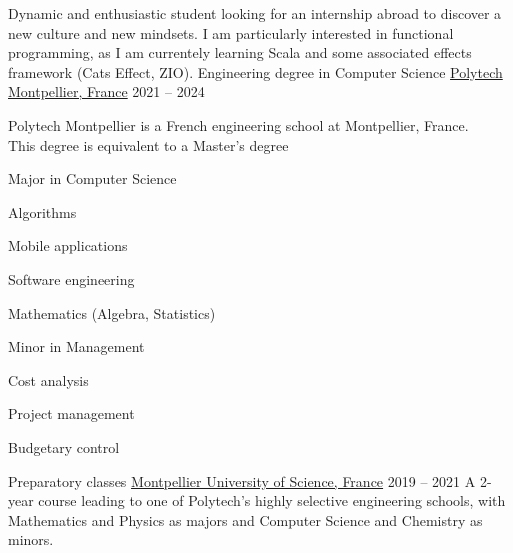 \documentclass[11pt]{spidercv}
\begin{document}
\begin{MainPart}

  \color{Black}
  \vspace{0.25cm}
  Dynamic and enthusiastic student looking for an internship abroad to discover a new culture and new mindsets. I am particularly interested in functional programming, as I am currentely learning Scala and some associated effects framework (Cats Effect, ZIO).
  \Experience
  {\ColorHighlight}
  {Engineering degree in Computer Science}
  {\href{https://english.polytech.umontpellier.fr/}{Polytech Montpellier, France}}
  {2021 -- 2024}
  {
    Polytech Montpellier is a French engineering school at Montpellier, France.\\
    This degree is equivalent to a Master's degree

    \begin{multicols}{2}
      Major in Computer Science
      \begin{ItemList}{\ColorHighlight}
        \item [\ding{226}] Algorithms
        \item [\ding{226}] Mobile applications
        \item [\ding{226}] Software engineering
        \item [\ding{226}] Mathematics (Algebra, Statistics)
      \end{ItemList}
      \columnbreak
      Minor in Management
      \begin{ItemList}{\ColorHighlight}
        \item [\ding{226}] Cost analysis
        \item [\ding{226}] Project management
        \item [\ding{226}] Budgetary control
      \end{ItemList}
    \end{multicols}
  }
  \Experience
  {\ColorHighlight}
  {Preparatory classes}
  {\href{https://www.umontpellier.fr/en/}{Montpellier University of Science, France}}
  {2019 -- 2021}
  {
    A 2-year course leading to one of Polytech's highly selective engineering schools, with Mathematics and Physics as majors and Computer Science and Chemistry as minors.
  }


\end{MainPart}
\end{document}
